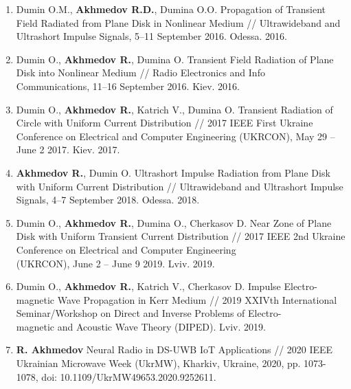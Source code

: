 {\begin{enumerate}
		\item Dumin O.M., \textbf{Akhmedov R.D.}, Dumina O.O. Propagation of 
		Transient Field Radiated from Plane Disk in Nonlinear Medium // 
		Ultrawideband and Ultrashort Impulse Signals, 5--11 September 2016. 
		Odessa. 2016.
		
		\item Dumin O., \textbf{Akhmedov R.}, Dumina O. Transient Field 
		Radiation of Plane Disk into Nonlinear Medium // Radio Electronics and 
		Info \\Communications, 11--16 September 2016. Kiev. 2016.
		
		\item Dumin O., \textbf{Akhmedov R.}, Katrich V., Dumina O. Transient 
		Radiation of Circle with Uniform Current Distribution // 2017 IEEE First 
		Ukraine Conference on Electrical and Computer Engineering (UKRCON), 
		May 29 -- June 2 2017. Kiev. 2017.
		
		\item \textbf{Akhmedov R.}, Dumin O. Ultrashort Impulse Radiation from 
		Plane Disk with Uniform Current Distribution // Ultrawideband and 
		Ultrashort Impulse Signals, 4--7 September 2018. Odessa. 2018.
		
		\item Dumin O., \textbf{Akhmedov R.}, Dumina O., Cherkasov D. Near Zone 
		of Plane Disk with Uniform Transient Current Distribution // 2017 IEEE 2nd 
		Ukraine Conference on Electrical and Computer Engineering \\
		(UKRCON), June 2 -- June 9 2019. Lviv. 2019.
		
		\item Dumin O., \textbf{Akhmedov R.}, Katrich V., Cherkasov D. 
		Impulse Electro-\\magnetic Wave Propagation in Kerr Medium // 2019 XXIVth 
		International Seminar/Workshop on Direct and Inverse Problems of 
		Electro-\\magnetic and Acoustic Wave Theory (DIPED). Lviv. 2019.
		
		\item  \textbf{R. Akhmedov} Neural Radio in DS-UWB IoT Applications // 2020 
		IEEE Ukrainian Microwave Week (UkrMW), Kharkiv, Ukraine, 2020, pp. 1073-1078, 
		doi: 10.1109/UkrMW49653.2020.9252611.
		
		\setcounter{ItemsInMyWriting}{\value{enumi}}
	\end{enumerate}
	
}